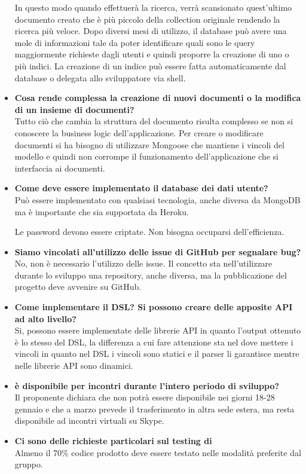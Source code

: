 \begin{itemize}
In questo modo quando effettuerà la ricerca, verrà scansionato quest'ultimo documento creato che è più piccolo della collection originale rendendo la ricerca più veloce.	 
Dopo diversi mesi di utilizzo, il database può avere una mole di informazioni tale da poter identificare quali sono le query
maggiormente richieste dagli utenti e quindi proporre la creazione di uno o più indici.
La creazione di un indice può essere fatta automaticamente dal database o delegata allo sviluppatore via shell.
		
		\item
		{\bfseries Cosa rende complessa la creazione di nuovi documenti o la modifica di un insieme di documenti?} \\
		Tutto ciò che cambia la struttura del documento risulta complesso se non si conoscere la business logic dell'applicazione.
		Per creare o modificare documenti si ha bisogno di utilizzare Mongoose che mantiene i vincoli del modello e quindi non corrompe il funzionamento dell'applicazione che si interfaccia ai documenti.
		
		\item
		{\bfseries Come deve essere implementato il database dei dati utente?} \\
		Può essere implementato con qualsiasi tecnologia, anche diversa da MongoDB ma è importante che sia supportata da Heroku.
		
		Le password devono essere criptate.
		Non bisogna occuparsi dell'efficienza.
		
		\item
		{\bfseries Siamo vincolati all'utilizzo delle issue di GitHub per segnalare bug?} \\
		No, non è necessario l'utilizzo delle issue. 
		Il concetto sta nell'utilizzare durante lo sviluppo una repository, anche diversa, ma la pubblicazione del
		progetto deve avvenire su GitHub.
		
		\item
		{\bfseries Come implementare il DSL? Si possono creare delle apposite API ad alto livello?} \\
		Si, possono essere implementate delle librerie API in quanto l'output ottenuto è lo stesso del DSL, la differenza a cui 	fare attenzione sta nel dove mettere i vincoli in quanto nel DSL i vincoli sono statici e il parser li garantisce mentre nelle librerie API sono dinamici.
		
		\item
		{\bfseries \Proponente{} è disponibile per incontri durante l'intero periodo di sviluppo?} \\
		Il proponente dichiara che non potrà essere disponibile nei giorni 18-28 gennaio e che a marzo prevede il trasferimento in
		altra sede estera, ma resta disponibile ad incontri virtuali su Skype.
				
		\item
		{\bfseries Ci sono delle richieste particolari sul testing di \ProjectName{}} \\
		Almeno il 70\% codice prodotto deve essere testato nelle modalità preferite dal gruppo.
		
	\end{itemize}
